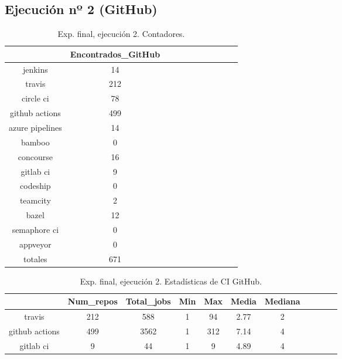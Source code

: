 \subsection{Ejecución nº 2 (GitHub)}
\begin{table}[h]
  \centering
  \caption{Exp. final, ejecución 2. Contadores.}
  \label{tab:tabla_f_2_1}

\begin{footnotesize}
\renewcommand{\arraystretch}{1.5} %
\begin{tabular}{ccccccccccc}
  \hline
  {} &  Encontrados\_GitHub \\
  \hline
  jenkins         &                  14 \\
  travis          &                 212 \\
  circle ci       &                  78 \\
  github actions  &                 499 \\
  azure pipelines &                  14 \\
  bamboo          &                   0 \\
  concourse       &                  16 \\
  gitlab ci       &                   9 \\
  codeship        &                   0 \\
  teamcity        &                   2 \\
  bazel           &                  12 \\
  semaphore ci    &                   0 \\
  appveyor        &                   0 \\
  totales         &                 671 \\
 \end{tabular}
\end{footnotesize}

\end{table}

\begin{table}[h]
  \centering
  \caption{Exp. final, ejecución 2. Estadísticas de CI GitHub.}
  \label{tab:tabla_f_2_2}

\begin{footnotesize}
\renewcommand{\arraystretch}{1.5} %
\begin{tabular}{ccccccccccc}
  \hline
  {} &  Num\_repos &  Total\_jobs &  Min &  Max &  Media &  Mediana \\
  \hline
  travis         &        212 &         588 &    1 &   94 &   2.77 &        2 \\
  github actions &        499 &        3562 &    1 &  312 &   7.14 &        4 \\
  gitlab ci      &          9 &          44 &    1 &    9 &   4.89 &        4 \\
 \end{tabular}
\end{footnotesize}

\end{table}

